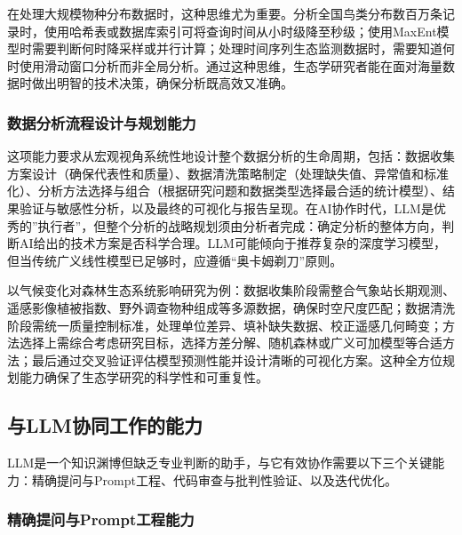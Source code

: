 \documentclass[
  twoside,12pt,fontset=none]{ctexbook}
\begin{document}
在处理大规模物种分布数据时，这种思维尤为重要。分析全国鸟类分布数百万条记录时，使用哈希表或数据库索引可将查询时间从小时级降至秒级；使用MaxEnt模型时需要判断何时降采样或并行计算；处理时间序列生态监测数据时，需要知道何时使用滑动窗口分析而非全局分析。通过这种思维，生态学研究者能在面对海量数据时做出明智的技术决策，确保分析既高效又准确。

\hypertarget{ux6570ux636eux5206ux6790ux6d41ux7a0bux8bbeux8ba1ux4e0eux89c4ux5212ux80fdux529b}{%
\subsubsection{数据分析流程设计与规划能力}\label{ux6570ux636eux5206ux6790ux6d41ux7a0bux8bbeux8ba1ux4e0eux89c4ux5212ux80fdux529b}}

这项能力要求从宏观视角系统性地设计整个数据分析的生命周期，包括：数据收集方案设计（确保代表性和质量）、数据清洗策略制定（处理缺失值、异常值和标准化）、分析方法选择与组合（根据研究问题和数据类型选择最合适的统计模型）、结果验证与敏感性分析，以及最终的可视化与报告呈现。在AI协作时代，LLM是优秀的''执行者''，但整个分析的战略规划须由分析者完成：确定分析的整体方向，判断AI给出的技术方案是否科学合理。LLM可能倾向于推荐复杂的深度学习模型，但当传统广义线性模型已足够时，应遵循``奥卡姆剃刀''原则。

以气候变化对森林生态系统影响研究为例：数据收集阶段需整合气象站长期观测、遥感影像植被指数、野外调查物种组成等多源数据，确保时空尺度匹配；数据清洗阶段需统一质量控制标准，处理单位差异、填补缺失数据、校正遥感几何畸变；方法选择上需综合考虑研究目标，选择方差分解、随机森林或广义可加模型等合适方法；最后通过交叉验证评估模型预测性能并设计清晰的可视化方案。这种全方位规划能力确保了生态学研究的科学性和可重复性。

\hypertarget{ux4e0ellmux534fux540cux5de5ux4f5cux7684ux80fdux529b}{%
\subsection{与LLM协同工作的能力}\label{ux4e0ellmux534fux540cux5de5ux4f5cux7684ux80fdux529b}}

LLM是一个知识渊博但缺乏专业判断的助手，与它有效协作需要以下三个关键能力：精确提问与Prompt工程、代码审查与批判性验证、以及迭代优化。

\hypertarget{ux7cbeux786eux63d0ux95eeux4e0epromptux5de5ux7a0bux80fdux529b}{%
\subsubsection{精确提问与Prompt工程能力}\label{ux7cbeux786eux63d0ux95eeux4e0epromptux5de5ux7a0bux80fdux529b}}
\end{document}

